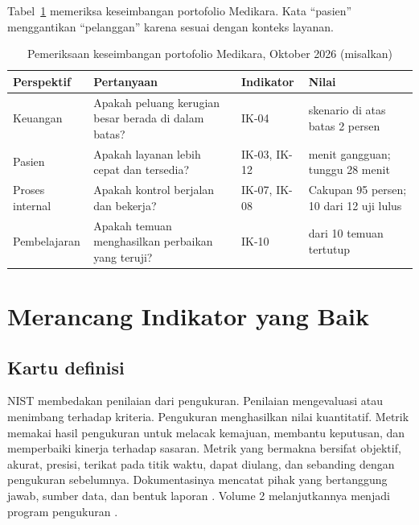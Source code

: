 Tabel~\ref{tab:ch13-keseimbangan} memeriksa keseimbangan portofolio Medikara. Kata ``pasien''
menggantikan ``pelanggan'' karena sesuai dengan konteks layanan.

\begin{table}[!htb]
  \centering\small
  \caption{Pemeriksaan keseimbangan portofolio Medikara, Oktober 2026 (misalkan)}
  \label{tab:ch13-keseimbangan}
  \begin{tabularx}{\textwidth}{|>{\raggedright\arraybackslash}p{}|>{\raggedright\arraybackslash}X|>{\raggedright\arraybackslash}p{}|>{\raggedright\arraybackslash}p{}|}
    \hline
    \textbf{Perspektif} & \textbf{Pertanyaan} & \textbf{Indikator} & \textbf{Nilai} \\ \hline
    Keuangan & Apakah peluang kerugian besar berada di dalam batas? & IK-04 & 1 skenario di atas
    batas 2 persen \\ \hline
    Pasien & Apakah layanan lebih cepat dan tersedia? & IK-03, IK-12 & 100 menit gangguan; tunggu
    28 menit \\ \hline
    Proses internal & Apakah kontrol berjalan dan bekerja? & IK-07, IK-08 & Cakupan 95 persen; 10
    dari 12 uji lulus \\ \hline
    Pembelajaran & Apakah temuan menghasilkan perbaikan yang teruji? & IK-10 & 9 dari 10 temuan
    tertutup \\ \hline
  \end{tabularx}
\end{table}

\section{Merancang Indikator yang Baik}

\subsection*{Kartu definisi}

NIST membedakan penilaian dari pengukuran. Penilaian mengevaluasi atau menimbang terhadap kriteria.
Pengukuran menghasilkan nilai kuantitatif. Metrik memakai hasil pengukuran untuk melacak kemajuan,
membantu keputusan, dan memperbaiki kinerja terhadap sasaran. Metrik yang bermakna bersifat
objektif, akurat, presisi, terikat pada titik waktu, dapat diulang, dan sebanding dengan pengukuran
sebelumnya. Dokumentasinya mencatat pihak yang bertanggung jawab, sumber data, dan bentuk laporan
\cite{c13-nist80055v1}. Volume 2 melanjutkannya menjadi program pengukuran \cite{c13-nist80055v2}.

